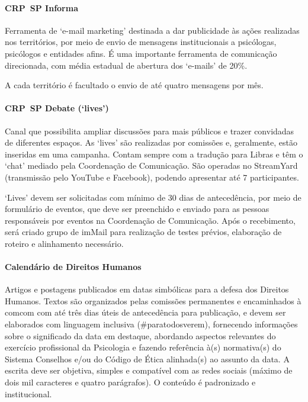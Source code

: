 \paragraph{CRP~SP Informa}

Ferramenta de `e-mail marketing' destinada a dar publicidade às ações realizadas nos territórios, por meio de envio de mensagens institucionais a psicólogas, psicólogos e entidades afins. É uma importante ferramenta de comunicação direcionada, com média estadual de abertura dos `e-mails' de 20\%.

A cada território é facultado o envio de até quatro mensagens por mês.

\paragraph{CRP~SP Debate (`lives')}

Canal que possibilita ampliar discussões para mais públicos e trazer convidadas de diferentes espaços. As `lives' são realizadas por comissões e, geralmente, estão inseridas em uma campanha. Contam sempre com a tradução para Libras e têm o `chat' mediado pela Coordenação de Comunicação. São operadas no StreamYard (transmissão pelo YouTube e Facebook), podendo apresentar até 7 participantes.

`Lives' devem ser solicitadas com mínimo de 30 dias de antecedência, por meio de formulário de eventos, que deve ser preenchido e enviado para as pessoas responsáveis por eventos na Coordenação de Comunicação. Após o recebimento, será criado grupo de imMail para realização de testes prévios, elaboração de roteiro e alinhamento necessário.

\paragraph{Calendário de Direitos Humanos}

Artigos e postagens publicados em datas simbólicas para a defesa dos Direitos Humanos. Textos são organizados pelas comissões permanentes e encaminhados à \ac{comcom} com até três dias úteis de antecedência para publicação, e devem ser elaborados com linguagem inclusiva (\#paratodosverem), fornecendo informações sobre o significado da data em destaque, abordando aspectos relevantes do exercício profissional da Psicologia e fazendo referência à(s) normativa(s) do Sistema Conselhos e/ou do Código de Ética alinhada(s) ao assunto da data. A escrita deve ser objetiva, simples e compatível com as redes sociais (máximo de dois mil caracteres e quatro parágrafos). O conteúdo é padronizado e institucional.

